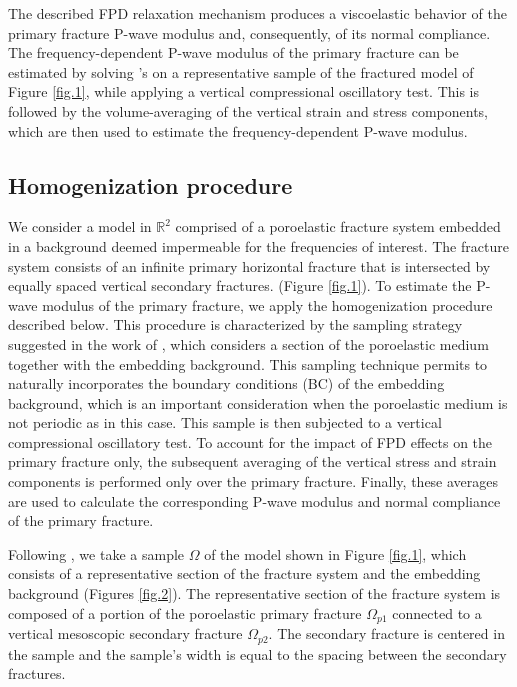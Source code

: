 \documentclass[draft]{agujournal2019}
\begin{document}
The described FPD relaxation mechanism produces a viscoelastic behavior of the primary fracture P-wave modulus and, consequently, of its normal compliance. 
The frequency-dependent P-wave modulus of the  primary fracture can be estimated by solving \citeauthor{Biot1941}'s \citeyear{Biot1941} on a representative sample of the fractured model of Figure \ref{fig.1}, while applying a vertical compressional oscillatory test. This is 
followed by the volume-averaging of the vertical strain and stress components, which are then used to estimate the frequency-dependent P-wave modulus.


\subsection{Homogenization procedure}
We consider a model in $\mathbb R^2$ comprised of a poroelastic fracture system embedded in a  background deemed impermeable for the frequencies of interest. The fracture system consists of an infinite primary horizontal fracture that is intersected by equally spaced vertical secondary fractures. 
(Figure \ref{fig.1}). To estimate the P-wave modulus of the primary fracture, we apply the homogenization procedure described below. This procedure is characterized by the sampling strategy suggested in the work of , which considers a section of the poroelastic medium together with the embedding background. This sampling technique permits to naturally incorporates the boundary conditions (BC) of the embedding background, which is an important consideration when the poroelastic medium is not periodic as in this case. This sample is then subjected to a vertical compressional oscillatory test. To account for the  impact of FPD effects on the primary fracture only, the subsequent averaging of the vertical stress and strain components is performed only over the primary fracture. Finally, these averages are used to calculate the corresponding  P-wave modulus and normal compliance of the primary fracture.

Following , we take a sample $\Omega$ of the model shown in Figure \ref{fig.1}, which consists of a representative section of the fracture system and the embedding background (Figures \ref{fig.2}). The representative section of the fracture system is composed of a portion of the poroelastic primary fracture $\Omega_{p1}$  connected to a vertical mesoscopic secondary fracture $\Omega_{p2}$. The secondary fracture is centered in the sample and the sample's width is  equal to the  spacing between the secondary fractures.
\end{document}

